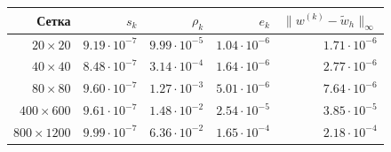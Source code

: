 \small
\begin{tabular}{rrrrr}
\toprule
Сетка & $s_k$ & $\rho_k$ & $e_k$ & $\|w^{(k)}-\widetilde w_h\|_\infty$\\
\midrule
$20\times20$ & $9.19\cdot10^{-7}$ & $9.99\cdot10^{-5}$ & $1.04\cdot10^{-6}$ & $1.71\cdot10^{-6}$\\
$40\times40$ & $8.48\cdot10^{-7}$ & $3.14\cdot10^{-4}$ & $1.64\cdot10^{-6}$ & $2.77\cdot10^{-6}$\\
$80\times80$ & $9.60\cdot10^{-7}$ & $1.27\cdot10^{-3}$ & $5.01\cdot10^{-6}$ & $7.64\cdot10^{-6}$\\
$400\times600$ & $9.61\cdot10^{-7}$ & $1.48\cdot10^{-2}$ & $2.54\cdot10^{-5}$ & $3.85\cdot10^{-5}$\\
$800\times1200$ & $9.99\cdot10^{-7}$ & $6.36\cdot10^{-2}$ & $1.65\cdot10^{-4}$ & $2.18\cdot10^{-4}$\\
\bottomrule
\end{tabular}
